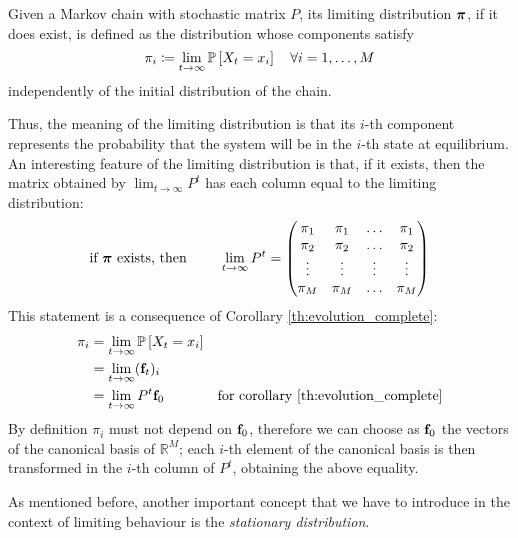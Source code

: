\begin{ndef}
    Given a Markov chain with stochastic matrix $P$, its limiting distribution $\boldsymbol{\pi}$, if it does exist, is defined as the distribution whose components satisfy
    \begin{equation}
        \pi_i \coloneqq \lim_{t \rightarrow \infty} \mathbb{P}\left[X_t = x_i\right] \quad \forall i=1,\dots,M
    \end{equation}
    independently of the initial distribution of the chain.
\end{ndef}
Thus, the meaning of the limiting distribution is that its $i$-th component represents the probability that the system will be in the $i$-th state at equilibrium. An interesting feature of the limiting distribution is that, if it exists, then the matrix obtained by $\lim_{t \rightarrow \infty} P^t$ has each column equal to the limiting distribution:
\begin{equation}
    \text{if $\boldsymbol{\pi}$ exists, then } \quad \quad \lim_{t \rightarrow \infty} P^t =
    \begin{pmatrix}
        \pi_1  & \pi_1  & \dots  & \pi_1  \\
        \pi_2  & \pi_2  & \dots  & \pi_2  \\
        \vdots & \vdots & \vdots & \vdots \\
        \pi_M  & \pi_M  & \dots  & \pi_M
    \end{pmatrix}
\end{equation}
This statement is a consequence of Corollary \ref{th:evolution_complete}:
    \begin{align}
        \pi_i
         & = \lim_{t \rightarrow \infty} \mathbb{P}\left[X_t = x_i\right]                                                       \\
         & = \lim_{t \rightarrow \infty} (\mathbf{f}_t)_i                                                               \\
         & = \lim_{t \rightarrow \infty} P^t \mathbf{f}_0         & \text{for corollary \ref{th:evolution_complete}}
    \end{align}   
By definition $\pi_i$ must not depend on $\mathbf{f}_0$, therefore we can choose as $\mathbf{f}_0$ the vectors of the canonical basis of $\mathbb{R}^M$; each $i$-th element of the canonical basis is then transformed in the $i$-th column of $P^t$, obtaining the above equality.

\medskip
As mentioned before, another important concept that we have to introduce in the context of limiting behaviour is the \emph{stationary distribution}.

